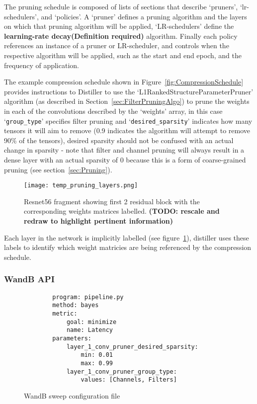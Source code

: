 \documentclass[../Dissertation.tex]{subfiles}
\begin{document}
The pruning schedule is composed of lists of sections that describe `{\color{mintedgreen}pruners}', `{\color{mintedgreen}lr-schedulers}', and `{\color{mintedgreen}policies}'. 
A `{\color{mintedgreen}pruner}' defines a pruning algorithm and the layers on which that pruning algorithm will be applied, `LR-schedulers' define the \textbf{learning-rate decay(Definition required)} algorithm. 
Finally each policy references an instance of a pruner or LR-scheduler, and controls when the respective algorithm will be applied, such as the start and end epoch, and the frequency of application.

The example compression schedule shown in Figure~\ref{fig:CompressionSchedule} provides instructions to Distiller to use the `L1RankedStructureParameterPruner' algorithm (as described in Section~\ref{sec:FilterPruningAlgo}) to prune the weights in each of the convolutions described by the `weights' array, in this case `\texttt{\color{mintedgreen}group\_type}' specifies filter pruning and `\texttt{\color{mintedgreen}desired\_sparsity}' indicates how many tensors it will aim to remove (0.9 indicates the algorithm will attempt to remove 90\% of the tensors), desired sparsity should not be confused with an actual change in sparsity - note that filter and channel pruning will always result in a dense layer with an actual sparsity of 0 because this is a form of coarse-grained pruning (see section~\ref{sec:Pruning}).

\begin{figure}[H]
    \texttt{[image: temp\_pruning\_layers.png]}
    \caption{Resnet56 fragment showing first 2 residual block with the corresponding weights matrices labelled. \textbf{(TODO: rescale and redraw to highlight pertinent information)}}
    \label{fig:resnet56weightlabels}
\end{figure}

Each layer in the network is implicitly labelled (see figure~\ref{fig:resnet56weightlabels}), distiller uses these labels to identify which weight matricies are being referenced by the compression schedule. 


\newpage
\subsubsection{WandB API}

\singlespacing
\begin{figure}[H]
    \begin{verbatim}
        program: pipeline.py
        method: bayes
        metric:
            goal: minimize
            name: Latency
        parameters:
            layer_1_conv_pruner_desired_sparsity:
                min: 0.01
                max: 0.99
            layer_1_conv_pruner_group_type:
                values: [Channels, Filters]
    \end{verbatim}
    \caption{WandB sweep configuration file}
    \label{fig:sweepConfig}
\end{figure}
\doublespacing
\end{document}

